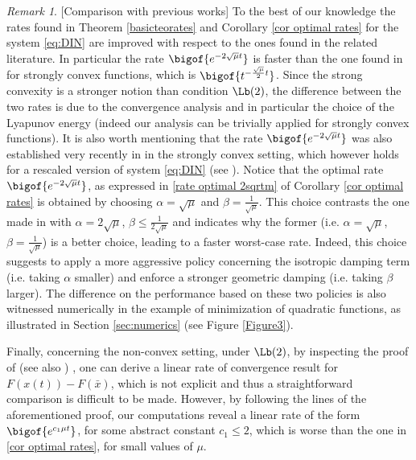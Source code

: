 \documentclass[reqno]{amsart}
\theoremstyle{plain}
\theoremstyle{definition}
\theoremstyle{remark}
\newtheorem{remark}{Remark}	%
\begin{document}
\begin{remark}\label{remark comparison}[Comparison with previous works]
To the best of our knowledge the rates found in Theorem \ref{basicteorates} and Corollary \ref{cor optimal rates} for the system \eqref{eq:DIN} are improved with respect to the ones found in the related literature. In particular the rate $\bigof{e^{-2\sqrt{\mu}t}}$ is faster than the one found in \cite[Theorem $7$]{attouch2022first} for strongly convex functions, which is $\bigof{t^{-\frac{\sqrt{\mu}}{2}t}}$. 
Since the strong convexity is a stronger notion than condition \hyperref[PL]{$\Lb(2)$}, the difference between the two rates is due to the convergence analysis and in particular the choice of the Lyapunov energy (indeed our analysis can be trivially applied for strongly convex functions). It is also worth mentioning that the rate $\bigof{e^{-2\sqrt{\mu}t}}$ was also established very recently in \cite{wang2025accelerated} in the strongly convex setting, which however holds for a rescaled version of system \eqref{eq:DIN} (see \cite[Corollary $2.2$]{wang2025accelerated}). Notice that the optimal rate $\bigof{e^{-2\sqrt{\mu}t}}$, as expressed in \eqref{rate optimal 2sqrtm} of Corollary \ref{cor optimal rates} is obtained by choosing $\alpha = \sqrt{\mu}$ and $\beta = \frac{1}{\sqrt{\mu}}$. This choice contrasts the one made in \cite[Theorem $7$]{attouch2022first} with $\alpha=2\sqrt{\mu}$, $\beta\leq \frac{1}{2\sqrt{\mu}}$ and indicates why the former (i.e. $\alpha = \sqrt{\mu}$, $\beta = \frac{1}{\sqrt{\mu}}$) is a better choice, leading to a faster worst-case rate. Indeed, this choice suggests to apply a more aggressive policy concerning the isotropic damping term (i.e. taking $\alpha$ smaller) and enforce a stronger geometric damping (i.e. taking $\beta$ larger). The difference on the performance based on these two policies is also witnessed numerically in the example of minimization of quadratic functions, as illustrated in Section \ref{sec:numerics} (see Figure \ref{Figure3}).

Finally, concerning the non-convex setting, under \hyperref[PL]{$\Lb(2)$}, by inspecting the proof of \cite[Theorem $13$]{castera2021inertial} (see also \cite[Theorem $3.4$]{maulen2024inertial}) , one can derive a linear rate of convergence result for $F(x(t))-F(\bar{x})$, which is not explicit and thus a straightforward comparison is difficult to be made. However, by following the lines of the aforementioned proof, our computations reveal a linear rate of the form $\bigof{e^{c_1\mu t}}$, for some abstract constant $c_{1}\leq2$, which is worse than the one in \cref{cor optimal rates}, for small values of $\mu$.
\end{remark}
\end{document}
